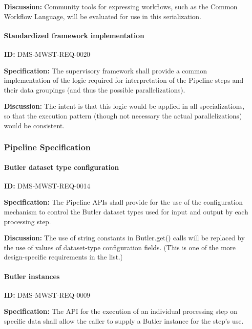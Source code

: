\documentclass[SE,toc,lsstdraft]{lsstdoc}
\begin{document}
\textbf{Discussion:}
Community tools for expressing workflows, such as the Common Workflow Language, will be evaluated for use in this serialization.

\paragraph{Standardized framework implementation}\hfill  %

\label{DMS-MWST-REQ-0020}
\textbf{ID:} DMS-MWST-REQ-0020

\textbf{Specification:}
The supervisory framework shall provide a common implementation of the logic required for interpretation of the Pipeline steps and their data groupings (and thus the possible parallelizations).

\textbf{Discussion:}
The intent is that this logic would be applied in all specializations, so that the execution pattern (though not necessary the actual parallelizations) would be consistent.

\subsubsection{Pipeline Specification}

\paragraph{Butler dataset type configuration}\hfill  %

\label{DMS-MWST-REQ-0014}
\textbf{ID:} DMS-MWST-REQ-0014

\textbf{Specification:}
The Pipeline APIs shall provide for the use of the configuration mechanism to control the Butler dataset types used for input and output by each processing step.

\textbf{Discussion:}
The use of string constants in Butler.get() calls will be replaced by the use of values of dataset-type configuration fields. (This is one of the more design-specific requirements in the list.)

\paragraph{Butler instances}\hfill  %

\label{DMS-MWST-REQ-0009}
\textbf{ID:} DMS-MWST-REQ-0009

\textbf{Specification:}
The API for the execution of an individual processing step on specific data shall allow the caller to supply a Butler instance for the step's use.
\end{document}
